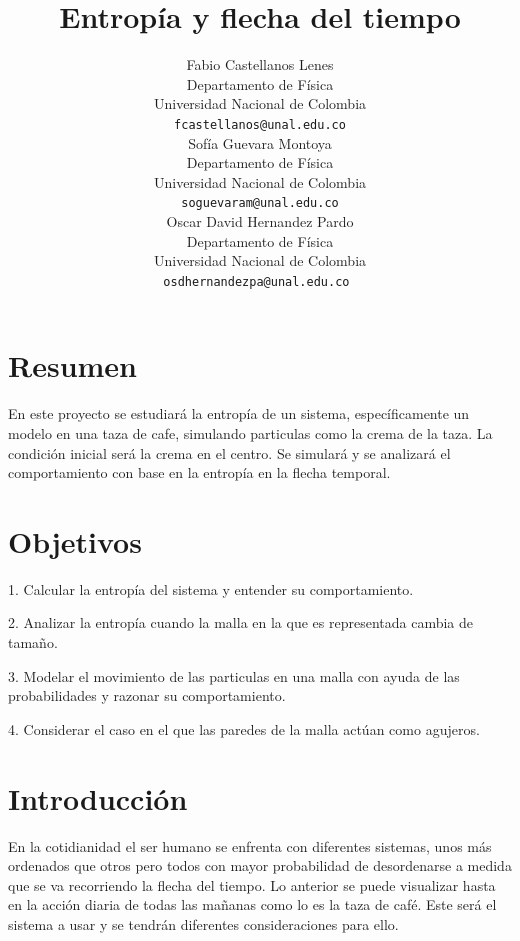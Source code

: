 \documentclass{article}
\title{Entropía y flecha del tiempo}
\author{
Fabio Castellanos Lenes\\
  Departamento de Física\\
  Universidad Nacional de Colombia\\
  \texttt{fcastellanos@unal.edu.co} \\
\And
Sofía Guevara Montoya\\
  Departamento de Física\\
  Universidad Nacional de Colombia\\
  \texttt{soguevaram@unal.edu.co} \\
\And
Oscar David Hernandez Pardo\\
  Departamento de Física\\
  Universidad Nacional de Colombia\\
  \texttt{osdhernandezpa@unal.edu.co } \\
}
\begin{document}
\maketitle

\begin{multicols}{2}

\section*{Resumen}
En este proyecto se estudiará la entropía de un sistema, específicamente un modelo en una taza de cafe, simulando particulas como la crema de la taza. La condición inicial será la crema en el centro. Se simulará y se analizará el comportamiento con base en la entropía en la flecha temporal.

\section*{Objetivos}

1. Calcular la entropía del sistema y entender su comportamiento.

2. Analizar la entropía cuando la malla en la que es representada cambia de tamaño.

3. Modelar el movimiento de las particulas en una malla con ayuda de las probabilidades y razonar su comportamiento.

4. Considerar el caso en el que las paredes de la malla actúan como agujeros.

\section*{Introducción}

En la cotidianidad el ser humano se enfrenta con diferentes sistemas, unos más ordenados que otros pero todos con mayor probabilidad de desordenarse a medida que se va recorriendo la flecha del tiempo. Lo anterior se puede visualizar hasta en la acción diaria de todas las mañanas como lo es la taza de café. Este será el sistema a usar y se tendrán diferentes consideraciones para ello.


\end{multicols}
\end{document}
